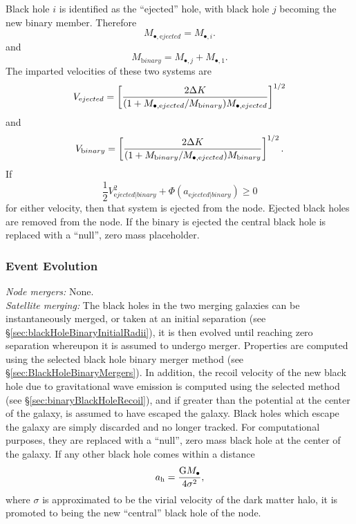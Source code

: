 Black hole $i$ is identified as the ``ejected'' hole, with black hole $j$ becoming the new binary member. Therefore
\begin{equation}
 M_{\bullet, \mathrm ejected} = M_{\bullet, i}.
\end{equation}
and
\begin{equation}
 M_{\mathrm binary} = M_{\mathrm \bullet, j} + M_{\mathrm \bullet, 1}.
\end{equation}
The imparted velocities of these two systems are
\begin{equation}
 V_{\mathrm ejected} = \left[ {2 \Delta K \over (1+M_{\bullet, \mathrm ejected}/M_{\mathrm binary} ) M_{\bullet, \mathrm ejected} }\right]^{1/2}
\end{equation}
and
\begin{equation}
 V_{\mathrm binary} = \left[ {2 \Delta K \over (1+M_{\mathrm binary} /M_{\bullet, \mathrm ejected}) M_{\mathrm binary}}\right]^{1/2}.
\end{equation}
If
\begin{equation}
 \frac{1}{2} V_{\mathrm ejected|binary}^2 + \Phi(a_{\mathrm ejected|binary}) \ge 0
\end{equation}
for either velocity, then that system is ejected from the node. Ejected black holes are removed from the node. If the binary is ejected the central black hole is replaced with a ``null'', zero mass placeholder.

\subsubsection{Event Evolution}

\noindent\emph{Node mergers:} None.\\

\noindent\emph{Satellite merging:} The black holes in the two merging galaxies can be instantaneously merged, or taken at an initial separation (see \S\ref{sec:blackHoleBinaryInitialRadii}), it is then evolved until reaching zero separation whereupon it is assumed to undergo merger. Properties are computed using the selected black hole binary merger method (see \S\ref{sec:BlackHoleBinaryMergers}). In addition, the recoil velocity of the new black hole due to gravitational wave emission is computed using the selected method (see \S\ref{sec:binaryBlackHoleRecoil}), and if greater than the potential at the center of the galaxy, is assumed to have escaped the galaxy. Black holes which escape the galaxy are simply discarded and no longer tracked. For computational purposes, they are replaced with a ``null'', zero mass black hole at the center of the galaxy. If any other black hole comes within a distance 
\begin{equation}
a_{\mathrm h} = {{\mathrm G} M_\bullet \over 4 \sigma^2},
\end{equation}
where $\sigma$ is approximated to be the virial velocity of the dark matter halo, it is promoted to being the new ``central'' black hole of the node.\\

